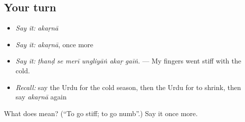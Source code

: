 \subsection*{Your turn}
\begin{itemize}
\raggedright
  \item \emph{Say it:} \emph{akaṛnā}
  \item \emph{Say it:} \emph{akaṛnā}, once more
  \item \emph{Say it:} \emph{ṭhanḍ se merī ungliyāṅ akaṛ gaīṅ.} — My fingers went stiff with the cold.
  \item \emph{Recall:} say the Urdu for the cold season, then the Urdu for to shrink, then say \emph{akaṛnā} again
\end{itemize}

\begin{tcolorbox}[breakable,colback=teal!4,colframe=teal!35!black,title={Before you move on}]
What does  mean? (\textquotedblleft{}To go stiff; to go numb\textquotedblright{}.) Say it once more.
\end{tcolorbox}
